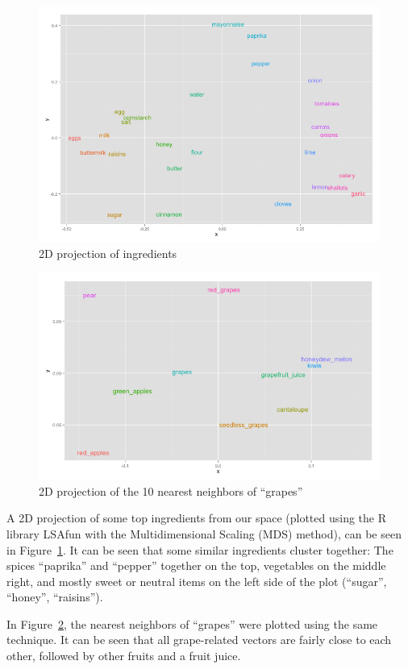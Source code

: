 \begin{figure}
    \begin{center}
        \includegraphics[scale=0.35]{toprainbow.png}
    \end{center}
    \caption{2D projection of ingredients}\label{fig:topsomething}
\end{figure}

\begin{figure}
    \begin{center}
        \includegraphics[scale=0.35]{grapes_final.png}
    \end{center}
    \caption{2D projection of the 10 nearest neighbors of ``grapes''}\label{fig:grapes}
\end{figure}

A 2D projection of some top ingredients from our space (plotted using the R library LSAfun \citep{LSAfun} with the Multidimensional Scaling (MDS) method), can be seen in Figure~\ref{fig:topsomething}. It can be seen that some similar ingredients cluster together: The spices ``paprika'' and ``pepper'' together on the top, vegetables on the middle right, and mostly sweet or neutral items on the left side of the plot (``sugar'', ``honey'', ``raisins'').

In Figure~\ref{fig:grapes}, the nearest neighbors of ``grapes'' were plotted using the same technique. It can be seen that all grape-related vectors are fairly close to each other, followed by other fruits and a fruit juice.
